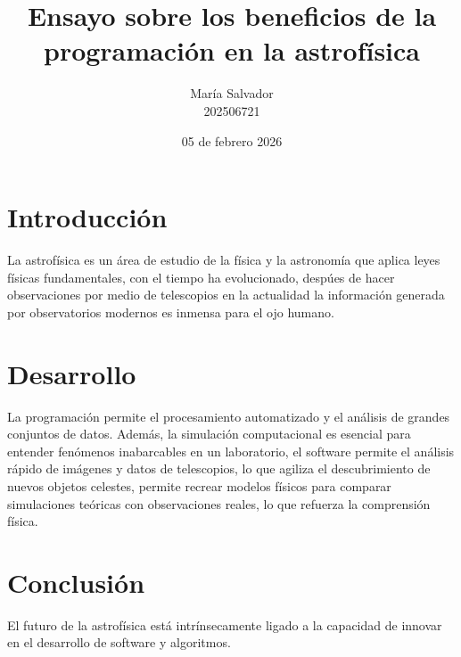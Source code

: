 \documentclass{article}
\title{Ensayo sobre los beneficios de la programación en la astrofísica}
\author{María Salvador\\
       202506721}
\date{05 de febrero 2026}
\begin{document}
\maketitle

\section{Introducción}
 La astrofísica es un área de estudio de la física y la astronomía que aplica leyes físicas fundamentales, con el tiempo ha evolucionado, despúes de hacer observaciones por medio de telescopios en la actualidad la información generada por observatorios modernos es inmensa para el ojo humano.\\
 
 \section{Desarrollo}
 La programación permite el procesamiento automatizado y el análisis de grandes conjuntos de datos.
 Además, la simulación computacional es esencial para entender fenómenos inabarcables en un laboratorio, el software permite el análisis rápido de imágenes y datos de telescopios, lo que agiliza el descubrimiento de nuevos objetos celestes, permite recrear modelos físicos para comparar simulaciones teóricas con observaciones reales, lo que refuerza la comprensión física.\\

\section{Conclusión}
El futuro de la astrofísica está intrínsecamente ligado a la capacidad de innovar en el desarrollo de software y algoritmos. 
\end{document}
